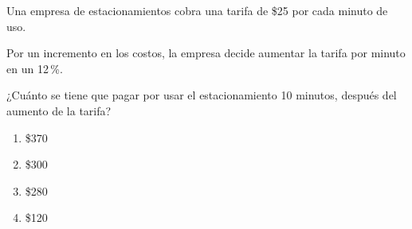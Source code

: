 \begin{problem}
    Una empresa de estacionamientos cobra una tarifa de \$25 por cada minuto de uso.

    Por un incremento en los costos, la empresa decide aumentar la tarifa por minuto en un 12\,\%.

    ¿Cuánto se tiene que pagar por usar el estacionamiento 10 minutos, después del aumento de la tarifa?

    \begin{enumerate}[label=\Alph*.]
        \item \$370
        \item \$300
        \item \$280
        \item \$120
    \end{enumerate}
\end{problem}
